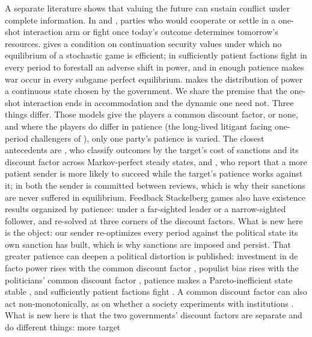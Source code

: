 A separate literature shows that valuing the future can sustain conflict
under complete information. In \citet{SkaperdasSyropoulos1996} and
\citet{GarfinkelSkaperdas2000}, parties who would cooperate or settle in a
one-shot interaction arm or fight once today's outcome determines tomorrow's
resources. \citet{Powell2004} gives a condition on continuation security
values under which no equilibrium of a stochastic game is efficient; in
\citet{Powell2012} sufficiently patient factions fight in every period to
forestall an adverse shift in power, and in \citet{KraininWiseman2016} enough
patience makes war occur in every subgame perfect equilibrium.
\citet{Powell2013} makes the distribution of power a continuous state chosen
by the government. We share the premise that the one-shot interaction ends in
accommodation and the dynamic one need not. Three things differ. Those models
give the players a common discount factor, or none, and where the players do
differ in patience (the long-lived litigant facing one-period challengers of
\citet[Appendix~B]{McBrideSkaperdas2009}), only one party's patience is
varied. The closest antecedents are \citet{Eaton1992}, who classify outcomes
by the target's cost of sanctions and its discount factor across
Markov-perfect steady states, and \citet{Eaton1999}, who report that a more
patient sender is more likely to succeed while the target's patience works
against it; in both the sender is committed between reviews, which is why
their sanctions are never suffered in equilibrium. Feedback Stackelberg games
also have existence results organized by patience: \citet{BressanJiang2020}
under a far-sighted leader or a narrow-sighted follower, and
\citet{Bucarey2023} re-solved at three corners of the discount factors. What is new here is
the object: our sender re-optimizes every period
against the political state its own sanction has built, which is why
sanctions are imposed and persist. That greater patience can deepen a political distortion is
published: investment in de facto power rises with the common discount factor
\citep[Proposition~2]{AcemogluRobinson2008}, populist bias rises with the
politicians' common discount factor \citep[Proposition~12]{AcemogluEgorovSonin2013},
patience makes a Pareto-inefficient state stable
\citep[Example~1]{AcemogluEgorovSonin2012}, and sufficiently patient factions
fight \citep{Powell2012}. A common discount factor can also act
non-monotonically, as on whether a society experiments with institutions
\citep[Proposition~7]{AcemogluEgorovSonin2015}. What is new here is that the two
governments' discount factors are separate and do different things: more target
